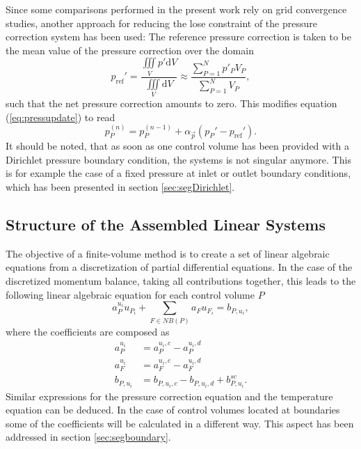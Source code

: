 Since some comparisons performed in the present work rely on grid convergence studies, another approach for reducing the lose constraint of the pressure correction system has been used: The reference pressure correction is taken to be the mean value of the pressure correction over the domain 
\begin{displaymath}
  p_{\text{ref}}' 
  = \frac{\iiint\limits_V p' \mathrm{d}V}{\iiint\limits_V \mathrm{d}V} 
    \approx \frac{\sum_{P = 1}^N p'_P V_P}{\sum_{P = 1}^N V_P},
\end{displaymath}
such that the net pressure correction amounts to zero. This modifies equation (\ref{eq:pressupdate}) to read
\begin{displaymath}
  p_P^{(n)} = p_P^{(n-1)} + \alpha_{\vec{p}} \left( p_P' - p_{\text{ref}}' \right).
\end{displaymath}
It should be noted, that as soon as one control volume has been provided with a Dirichlet pressure boundary condition, the systems is not singular anymore. This is for example the case of a fixed pressure at inlet or outlet boundary conditions, which has been presented in section \ref{sec:segDirichlet}.

\subsection{Structure of the Assembled Linear Systems}
\label{sec:structure}

The objective of a finite-volume method is to create a set of linear algebraic equations from a discretization of partial differential equations. In the case of the discretized momentum balance, taking all contributions together, this leads to the following linear algebraic equation for each control volume \(P\)
\begin{displaymath}
  a_P^{u_i} u_{P_i} + \sum_{F \in NB(P)} a_F u_{F_i} = b_{P,u_i},
\end{displaymath}
where the coefficients are composed as
\begin{align*}
  a_P^{u_i} &= a_P^{u_i,c} - a_P^{u_i,d} \\
  a_F^{u_i} &= a_F^{u_i,c} - a_F^{u_i,d} \\
  b_{P,u_i} &= b_{P,u_i,c} - b_{P,u_i,d} + b_{P,u_i}^{sc}.
\end{align*}
Similar expressions for the pressure correction equation and the temperature equation can be deduced. In the case of control volumes located at boundaries some of the coefficients will be calculated in a different way. This aspect has been addressed in section \ref{sec:segboundary}.

